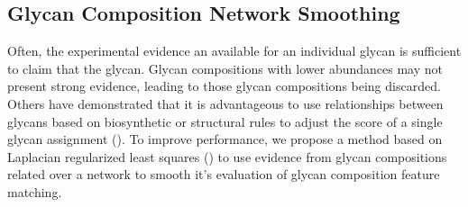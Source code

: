 \subsection{Glycan Composition Network Smoothing}
    Often, the experimental evidence an available for an individual glycan is
    sufficient to claim that the glycan. Glycan compositions with lower abundances
    may not present strong evidence, leading to those glycan compositions being
    discarded. Others have demonstrated that it is advantageous to use relationships
    between glycans based on biosynthetic or structural rules to adjust the score
    of a single glycan assignment (\cite{Goldberg2009, Kronewitter2014}). To improve
    performance, we propose a method based on Laplacian regularized least squares
    (\cite{Belkin2006}) to use evidence from glycan compositions related over a
    network to smooth it's evaluation of glycan composition feature matching.

    

    

    

    